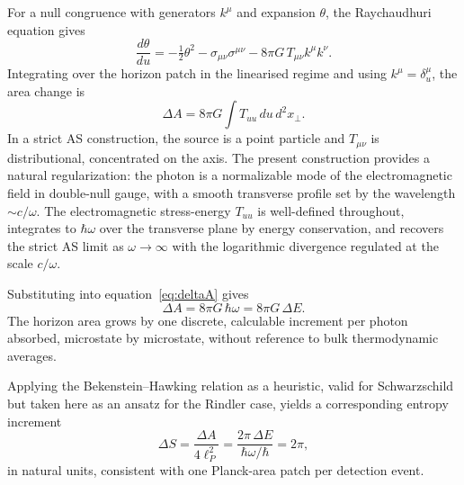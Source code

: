 \documentclass[12pt,a4paper]{article}
\begin{document}
For a null congruence with generators $k^\mu$ and expansion 
$\theta$, the Raychaudhuri equation gives
\begin{equation}
\frac{d\theta}{du} = -\tfrac{1}{2}\theta^2 
    - \sigma_{\mu\nu}\sigma^{\mu\nu} 
    - 8\pi G\, T_{\mu\nu} k^\mu k^\nu.
\end{equation}
Integrating over the horizon patch in the linearised regime 
and using $k^\mu = \delta^\mu_u$, the area change is
\begin{equation}
\Delta A = 8\pi G \int T_{uu}\, du\, d^2x_\perp.
\label{eq:deltaA}
\end{equation}
In a strict AS construction, the source is a point particle 
and $T_{\mu\nu}$ is distributional, concentrated on the axis. 
The present construction provides a natural regularization: the 
photon is a normalizable mode of the electromagnetic field in 
double-null gauge, with a smooth transverse profile set by the 
wavelength $\sim c/\omega$. The electromagnetic stress-energy 
$T_{uu}$ is well-defined throughout, integrates to $\hbar\omega$ 
over the transverse plane by energy conservation, and recovers 
the strict AS limit as $\omega \to \infty$ with the logarithmic 
divergence regulated at the scale $c/\omega$.

Substituting into equation~\eqref{eq:deltaA} gives
\begin{equation}
\boxed{\Delta A = 8\pi G\,\hbar\omega = 8\pi G\,\Delta E.}
\label{eq:deltaA_result}
\end{equation}
The horizon area grows by one discrete, calculable increment 
per photon absorbed, microstate by microstate, without 
reference to bulk thermodynamic averages.


Applying the Bekenstein--Hawking relation as a heuristic, valid for Schwarzschild but taken here as an ansatz 
for the Rindler case, yields a corresponding entropy 
increment
\begin{equation}
\Delta S = \frac{\Delta A}{4\ell_P^2} 
         = \frac{2\pi\,\Delta E}{\hbar\omega/\hbar}
         = 2\pi,
\end{equation}
in natural units, consistent with one Planck-area patch per 
detection event.

\end{document}
